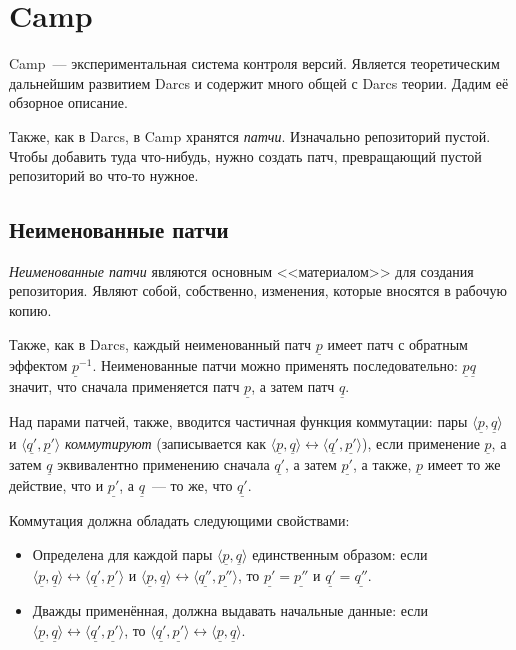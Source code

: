 \section{Camp}

Camp~--- экспериментальная система контроля версий. Является
теоретическим дальнейшим развитием Darcs и содержит много общей с
Darcs теории. Дадим её обзорное описание.

Также, как в Darcs, в Camp хранятся \emph{патчи}. Изначально
репозиторий пустой. Чтобы добавить туда что-нибудь, нужно создать
патч, превращающий пустой репозиторий во что-то нужное.

\subsection{Неименованные патчи}

\emph{Неименованные патчи} являются основным <<материалом>> для
создания репозитория. Являют собой, собственно, изменения, которые
вносятся в рабочую копию. 

Также, как в Darcs, каждый неименованный патч $\underline{p}$ имеет
патч с обратным эффектом $\underline{p}^{-1}$. Неименованные патчи
можно применять последовательно: $\underline{p}\underline{q}$ значит,
что сначала применяется патч $\underline{p}$, а затем патч
$\underline{q}$.

Над парами патчей, также, вводится частичная функция коммутации: пары
$\langle\underline{p}, \underline{q}\rangle$ и
$\langle\underline{q'}, \underline{p'}\rangle$ \emph{коммутируют}
(записывается как $\langle\underline{p}, \underline{q}\rangle
\longleftrightarrow \langle\underline{q'}, \underline{p'}\rangle$),
если применение $\underline{p}$, а затем $\underline{q}$ эквивалентно
применению сначала $\underline{q'}$, а затем $\underline{p'}$, а
также, $\underline{p}$ имеет то же действие, что и $\underline{p'}$, а
$\underline{q}$~--- то же, что $\underline{q'}$.

Коммутация должна обладать следующими свойствами:

\begin{itemize}
\item Определена для каждой пары $\langle \underline{p}, \underline{q}
  \rangle$ единственным образом: если $\langle \underline{p},
  \underline{q} \rangle \longleftrightarrow \langle \underline{q'},
  \underline{p'}\rangle$ и $\langle \underline{p}, \underline{q}
  \rangle \longleftrightarrow \langle \underline{q''},
  \underline{p''}\rangle$, то $\underline{p'} = \underline{p''}$ и
  $\underline{q'} = \underline{q''}$.
\item Дважды применённая, должна выдавать начальные данные: если
  $\langle \underline{p}, \underline{q} \rangle \longleftrightarrow
  \langle \underline{q'}, \underline{p'}\rangle$, то $\langle
  \underline{q'}, \underline{p'} \rangle \longleftrightarrow \langle
  \underline{p}, \underline{q}\rangle$.
\end{itemize}

